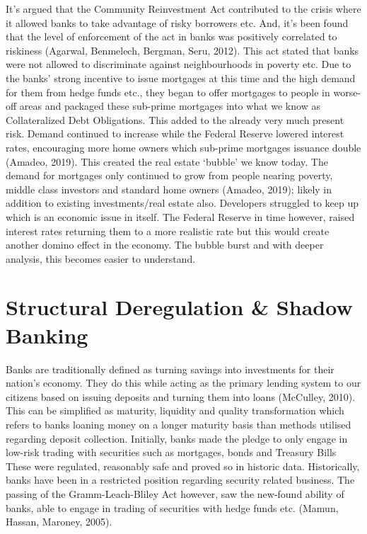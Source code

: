 \documentclass[11pt, english]{article}
\begin{document}
	It’s argued that the Community Reinvestment Act contributed to the crisis where it allowed banks to take advantage of risky borrowers etc. And, it’s been found that the level of enforcement of the act in banks was positively correlated to riskiness (Agarwal, Benmelech, Bergman, Seru, 2012). This act stated that banks were not allowed to discriminate against neighbourhoods in poverty etc. Due to the banks’ strong incentive to issue mortgages at this time and the high demand for them from hedge funds etc., they began to offer mortgages to people in worse-off areas and packaged these sub-prime mortgages into what we know as Collateralized Debt Obligations. This added to the already very much present risk. Demand continued to increase while the Federal Reserve lowered interest rates, encouraging more home owners which sub-prime mortgages issuance double (Amadeo,  2019). This created the real estate ‘bubble’ we know today. The demand for mortgages only continued to grow from people nearing poverty, middle class investors and standard home owners (Amadeo, 2019); likely in addition to existing investments/real estate also. Developers struggled to keep up which is an economic issue in itself. The Federal Reserve in time however, raised interest rates returning them to a more realistic rate but this would create another domino effect in the economy. The bubble burst and with deeper analysis, this becomes easier to understand.

\newpage

\section{Structural Deregulation \& Shadow Banking}

	Banks are traditionally defined as turning savings into investments for their nation’s economy. They do this while acting as the primary lending system to our citizens based on issuing deposits and turning them into loans (McCulley, 2010). This can be simplified as maturity, liquidity and quality transformation which refers to banks loaning money on a longer maturity basis than methods utilised regarding deposit collection. Initially, banks made the pledge to only engage in low-risk trading with securities such as mortgages, bonds and Treasury Bills These were regulated, reasonably safe and proved so in historic data. Historically, banks have been in a restricted position regarding security related business. The passing of the Gramm-Leach-Bliley Act however, saw the new-found ability of banks, able to engage in trading of securities with hedge funds etc. (Mamun, Hassan, Maroney, 2005).\\
\end{document}

